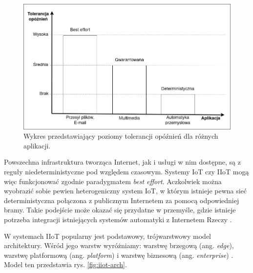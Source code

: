 \documentclass[a4paper, 12pt, twoside]{article}
\begin{document}
\begin{figure}[h]
    \centering
    \includegraphics[scale=0.45]{tolerancja.png}
    \caption{Wykres przedstawiający poziomy tolerancji opóźnień dla różnych aplikacji.}
    \label{fig:tolerancja}
\end{figure}

Powszechna infrastruktura tworząca Internet, jak i usługi w nim dostępne, są z reguły
niedeterministyczne pod względem czasowym. Systemy IoT czy IIoT mogą więc
funkcjonować zgodnie paradygmatem \emph{best effort}. Aczkolwiek można wyobrazić 
sobie pewien heterogeniczny system
IoT, w którym istnieje pewna sieć deterministyczna połączona z publicznym Internetem
za pomocą odpowiedniej bramy. Takie podejście może okazać się przydatne w przemyśle, gdzie 
istnieje potrzeba integracji istniejących systemów automatyki z Internetem Rzeczy \cite{iiot-design-and-impl-gateway}.

W systemach IIoT popularny jest podstawowy, trójwarstwowy model architektury. Wśród jego
warstw wyróżniamy: warstwę brzegową (ang. \emph{edge}), warstwę platformową (ang. \emph{platform})
i warstwę biznesową (ang. \emph{enterprise}) \cite{iiot-challenges-opportunities-directions}.
Model ten przedstawia rys. \ref{fig:iiot-arch}.
\end{document}
